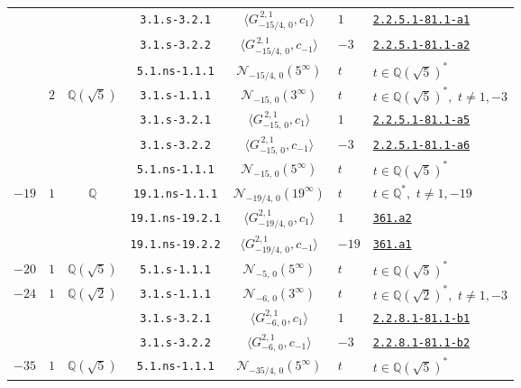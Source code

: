 \documentclass[11pt]{amsart}
\newcommand{\eclabel}[1]{\href{https://www.lmfdb.org/EllipticCurve/Q/#1}{\texttt{#1}}}
\newcommand{\ecnflabel}[2]{\href{https://www.lmfdb.org/EllipticCurve/#1-#2}{\texttt{#1-#2}}}
\theoremstyle{definition}
\newcommand{\Q}{\mathbb Q}
\newcommand{\QQ}{\mathbb Q}
\begin{document}
{\begin{longtable}{|c|c|c|c|c|l|l|}
 & & & \texttt{3.1.s-3.2.1} & $\langle G^{\,2,1}_{-15/4,\,0},c_{1}\rangle$ &   $1$ &  \ecnflabel{2.2.5.1}{81.1-a1} \\ \cline{4-7} 
 & & & \texttt{3.1.s-3.2.2} & $\langle G^{\, 2,1}_{-15/4,\,0},c_{-1}\rangle$ &   $-3$ &  \ecnflabel{2.2.5.1}{81.1-a2} \\ \cline{4-7}  
 & & &  \texttt{5.1.ns-1.1.1} & $\mathcal{N}_{-15/4,\,0}(5^{\infty})$ &   $t$ &  $t\in \Q(\sqrt{5})^*$ \\ \cline{2-7}
 &  {$2$} &  {$\Q(\sqrt{5})$} 
&  \texttt{3.1.s-1.1.1} & $\mathcal{N}_{-15,\,0}(3^{\infty})$ &   $t$ &  $t\in \Q(\sqrt{5})^*,\,\,t\ne 1,-3 $ \\ \cline{4-7} 
 & &&  \texttt{3.1.s-3.2.1} & $\langle G^{\,2,1}_{-15,\,0},c_{1}\rangle$ &   $1$ &  \ecnflabel{2.2.5.1}{81.1-a5} \\ \cline{4-7} 
 & &&  \texttt{3.1.s-3.2.2} & $\langle G^{\, 2,1}_{-15,\,0},c_{-1}\rangle$ &   $-3$ &  \ecnflabel{2.2.5.1}{81.1-a6} \\ \cline{4-7} 
 & &&  \texttt{5.1.ns-1.1.1} & $\mathcal{N}_{-15,\,0}(5^{\infty})$ &   $t$ &  $t\in \Q(\sqrt{5})^*$ \\ \hline
{$-19$} & {$1$}  & {$\QQ$}   
& \texttt{19.1.ns-1.1.1} & $\mathcal{N}_{-19/4,\,0}(19^{\infty})$  &   $t$ &  $t\in \Q^*,\,\,t\ne 1,-19 $ \\ \cline{4-7} 
 & &  & \texttt{19.1.ns-19.2.1} & $\langle G^{2,1}_{-19/4,\,0},c_{1}\rangle$ &   $1$ & \eclabel{361.a2}  \\ \cline{4-7} 
 & &  & \texttt{19.1.ns-19.2.2} & $\langle G^{2,1}_{-19/4,\,0},c_{-1}\rangle$ &   $-19$ & \eclabel{361.a1} \\ \hline
$-20$ & $1$ & $\Q(\sqrt{5})$ & \texttt{5.1.s-1.1.1} & $\mathcal{N}_{-5,\,0}(5^{\infty})$ &   $t$ &  $t\in \Q(\sqrt{5})^*$ \\ \hline
{$-24$}  & {$1$} &  {$\Q(\sqrt{2})$} 
  & \texttt{3.1.s-1.1.1} & $\mathcal{N}_{-6,\,0}(3^{\infty})$ &   $t$ &  $t\in \Q(\sqrt{2})^*,\,\,t\ne 1,-3 $ \\ \cline{4-7} 
& & & \texttt{3.1.s-3.2.1} & $\langle G^{2,1}_{-6,\,0},c_{1}\rangle$ &   $1$ &  \ecnflabel{2.2.8.1}{81.1-b1} \\ \cline{4-7} 
& & &   \texttt{3.1.s-3.2.2} & $\langle G^{2,1}_{-6,\,0},c_{-1}\rangle$ &   $-3$ &  \ecnflabel{2.2.8.1}{81.1-b2} \\ \hline
{$-35$}  & {$1$} &  {$\Q(\sqrt{5})$} 
&  \texttt{5.1.ns-1.1.1} & $\mathcal{N}_{-35/4,\,0}(5^{\infty})$ &   $t$ &  $t\in \Q(\sqrt{5})^*$ \\ \cline{4-7} 

\end{longtable}}
\end{document}
